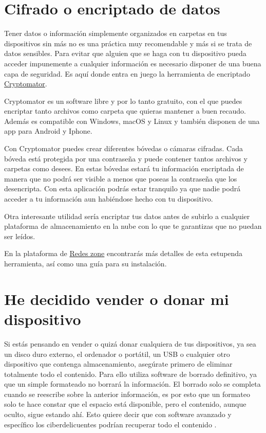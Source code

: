 \documentclass[
  a4paper,
  openany]{book}
\begin{document}
\hypertarget{cifrado-o-encriptado-de-datos}{%
\section{Cifrado o encriptado de datos}\label{cifrado-o-encriptado-de-datos}}

Tener datos o información simplemente organizados en carpetas en tus dispositivos sin más no es una práctica muy recomendable y más si se trata de datos sensibles. Para evitar que alguien que se haga con tu dispositivo pueda acceder impunemente a cualquier información es necesario disponer de una buena capa de seguridad. Es aquí donde entra en juego la herramienta de encriptado \href{https://cryptomator.org/}{Cryptomator}.

Cryptomator es un software libre y por lo tanto gratuito, con el que puedes encriptar tanto archivos como carpeta que quieras mantener a buen recaudo. Además es compatible con Windows, macOS y Linux y también disponen de una app para Android y Iphone.

Con Cryptomator puedes crear diferentes bóvedas o cámaras cifradas. Cada bóveda está protegida por una contraseña y puede contener tantos archivos y carpetas como desees. En estas bóvedas estará tu información encriptada de manera que no podrá ser visible a menos que poseas la contraseña que los desencripta. Con esta aplicación podrás estar tranquilo ya que nadie podrá acceder a tu información aun habiéndose hecho con tu dispositivo.

Otra interesante utilidad sería encriptar tus datos antes de subirlo a cualquier plataforma de almacenamiento en la nube con lo que te garantizas que no puedan ser leídos.

En la plataforma de \href{https://www.redeszone.net/tutoriales/seguridad/cryptomator-encriptar-archivos-carpetas/}{Redes zone} encontrarás más detalles de esta estupenda herramienta, así como una guía para su instalación.

\hypertarget{he-decidido-vender-o-donar-mi-dispositivo}{%
\section{He decidido vender o donar mi dispositivo}\label{he-decidido-vender-o-donar-mi-dispositivo}}

Si estás pensando en vender o quizá donar cualquiera de tus dispositivos, ya sea un disco duro externo, el ordenador o portátil, un USB o cualquier otro dispositivo que contenga almacenamiento, asegúrate primero de eliminar totalmente todo el contenido. Para ello utiliza software de borrado definitivo, ya que un simple formateado no borrará la información. El borrado solo se completa cuando se reescribe sobre la anterior información, es por esto que un formateo solo te hace constar que el espacio está disponible, pero el contenido, aunque oculto, sigue estando ahí. Esto quiere decir que con software avanzado y específico los ciberdelicuentes podrían recuperar todo el contenido \citep{XATAKA-borrado-almacenamiento}.
\end{document}
